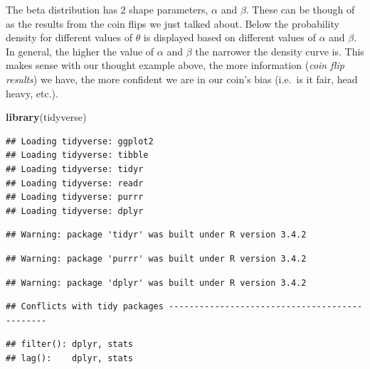 \documentclass[]{book}
\newenvironment{Shaded}{\begin{snugshade}}{\end{snugshade}}
\newcommand{\KeywordTok}[1]{\textcolor[rgb]{0.13,0.29,0.53}{\textbf{#1}}}
\newcommand{\NormalTok}[1]{#1}
\theoremstyle{definition}
\theoremstyle{definition}
\theoremstyle{definition}
\theoremstyle{remark}
\begin{document}
The beta distribution has 2 shape parameters, \(\alpha\) and \(\beta\).
These can be though of as the results from the coin flips we just talked
about. Below the probability density for different values of \(\theta\)
is displayed based on different values of \(\alpha\) and \(\beta\). In
general, the higher the value of \(\alpha\) and \(\beta\) the narrower
the density curve is. This makes sense with our thought example above,
the more information (\emph{coin flip results}) we have, the more
confident we are in our coin's bias (i.e.~is it fair, head heavy, etc.).

\begin{Shaded}
\begin{Highlighting}[]
\KeywordTok{library}\NormalTok{(tidyverse)}
\end{Highlighting}
\end{Shaded}

\begin{verbatim}
## Loading tidyverse: ggplot2
## Loading tidyverse: tibble
## Loading tidyverse: tidyr
## Loading tidyverse: readr
## Loading tidyverse: purrr
## Loading tidyverse: dplyr
\end{verbatim}

\begin{verbatim}
## Warning: package 'tidyr' was built under R version 3.4.2
\end{verbatim}

\begin{verbatim}
## Warning: package 'purrr' was built under R version 3.4.2
\end{verbatim}

\begin{verbatim}
## Warning: package 'dplyr' was built under R version 3.4.2
\end{verbatim}

\begin{verbatim}
## Conflicts with tidy packages ----------------------------------------------
\end{verbatim}

\begin{verbatim}
## filter(): dplyr, stats
## lag():    dplyr, stats
\end{verbatim}
\end{document}
